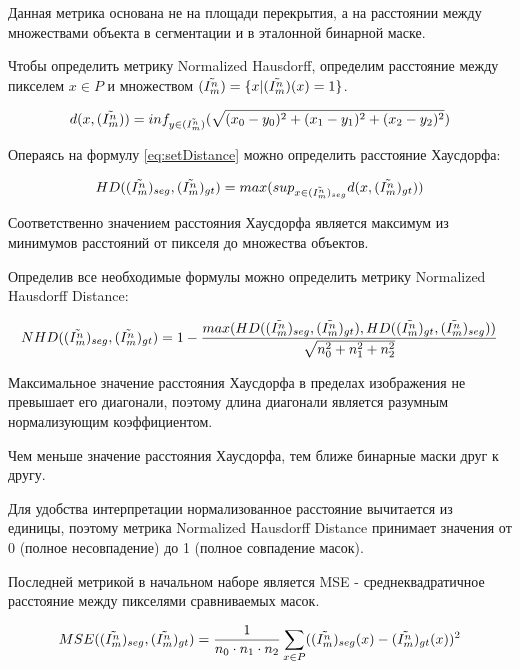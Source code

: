 Данная метрика основана не на площади перекрытия, а на расстоянии между множествами объекта в сегментации и в эталонной бинарной маске. 

Чтобы определить метрику Normalized Hausdorff, определим расстояние между пикселем \(x \in P\) и множеством \((\tilde{I^n_m}) = \{x | (\tilde{I^n_m})(x) = 1\}\).

\begin{equation}\label{eq:setDistance}
    d(x,(\tilde{I^n_m})) = inf_{y\in (\tilde{I^n_m})} (\sqrt{(x_0 - y_0)^2 + (x_1 - y_1)^2 + (x_2 - y_2)^2})
\end{equation}

Операясь на формулу \ref{eq:setDistance} можно определить расстояние Хаусдорфа:

\begin{equation}\label{eq:HausdorffDistance}
    HD((\tilde{I^n_m})_{seg}, (\tilde{I^n_m})_{gt}) = max(sup_{x \in (\tilde{I^n_m})_{seg}}d(x, (\tilde{I^n_m})_{gt}))
\end{equation}

Соответственно значением расстояния Хаусдорфа является максимум из минимумов расстояний от пикселя до множества объектов.

Определив все необходимые формулы можно определить метрику Normalized Hausdorff Distance:

\begin{equation}\label{eq:NormalizedHausdorffDistance}
    NHD((\tilde{I^n_m})_{seg}, (\tilde{I^n_m})_{gt}) = 1 - \frac{max(HD((\tilde{I^n_m})_{seg}, (\tilde{I^n_m})_{gt}), HD((\tilde{I^n_m})_{gt}, (\tilde{I^n_m})_{seg}))}{\sqrt{n_0^2 + n_1^2 + n_2^2}}
\end{equation}

Максимальное значение расстояния Хаусдорфа в пределах изображения не превышает его диагонали, поэтому длина диагонали является разумным нормализующим коэффициентом.

Чем меньше значение расстояния Хаусдорфа, тем ближе бинарные маски друг к другу.

Для удобства интерпретации нормализованное расстояние вычитается из единицы, поэтому метрика Normalized Hausdorff Distance принимает значения от 0 (полное несовпадение) до 1 (полное совпадение масок).

Последней метрикой в начальном наборе является MSE - среднеквадратичное расстояние между пикселями сравниваемых масок.

\begin{equation}\label{eq:MSE}
    MSE((\tilde{I^n_m})_{seg}, (\tilde{I^n_m})_{gt}) = \frac{1}{n_0 \cdot n_1 \cdot n_2} \sum_{x \in P} ((\tilde{I^n_m})_{seg}(x) - (\tilde{I^n_m})_{gt}(x))^2
\end{equation}

